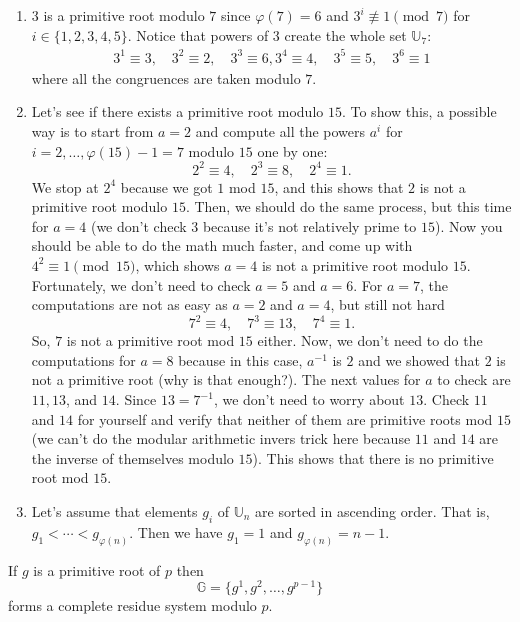 \documentclass{subfile}
\begin{document}
		\begin{example}
		$ $
		\begin{enumerate}
			\item $3$ is a primitive root modulo $7$ since $\varphi(7)=6$ and $3^i\not\equiv1\pmod 7$ for $i\in\{1,2,3,4,5\}$. Notice that powers of $3$ create the whole set $\mathbb U_7$:
			\begin{align*}
				3^1 \equiv 3, \quad 3^2 \equiv 2, \quad 3^3 \equiv 6, 3^4 \equiv 4, \quad 3^5 \equiv 5, \quad 3^6 \equiv 1
			\end{align*}
			where all the congruences are taken modulo $7$.
			\item Let's see if there exists a primitive root modulo $15$. To show this, a possible way is to start from $a=2$ and compute all the powers $a^i$ for $i=2,\ldots,\varphi(15)-1=7$ modulo $15$ one by one:
			$$ 2^2 \equiv 4, \quad 2^3 \equiv 8, \quad 2^4 \equiv 1.$$
			We stop at $2^4$ because we got $1$ mod $15$, and this shows that $2$ is not a primitive root modulo $15$. Then, we should do the same process, but this time for $a=4$ (we don't check $3$ because it's not relatively prime to $15$). Now you should be able to do the math much faster, and come up with $4^2 \equiv 1 \pmod{15}$, which shows $a=4$ is not a primitive root modulo $15$. Fortunately, we don't need to check $a=5$ and $a=6$. For $a=7$, the computations are not as easy as $a=2$ and $a=4$, but still not hard
			$$7^2 \equiv 4, \quad 7^3 \equiv 13, \quad 7^4 \equiv 1.$$
			So, $7$ is not a primitive root mod $15$ either. Now, we don't need to do the computations for $a=8$ because in this case, $a^{-1}$ is $2$ and we showed that $2$ is not a primitive root (why is that enough?). The next values for $a$ to check are $11, 13$, and $14$. Since $13=7^{-1}$, we don't need to worry about $13$. Check $11$ and $14$ for yourself and verify that neither of them are primitive roots mod $15$ (we can't do the modular arithmetic invers trick here because $11$ and $14$ are the inverse of themselves modulo $15$). This shows that there is no primitive root mod $15$.

			\item Let's assume that elements $g_i$ of $\mathbb U_n$ are sorted in ascending order. That is, $g_1<\cdots<g_{\varphi(n)}$. Then we  have $g_1=1$ and $g_{\varphi(n)}=n-1$.
		\end{enumerate}
	\end{example}


	\begin{corollary}\label{cor:prres}
		If $g$ is a primitive root of $p$ then
		\[\mathbb G=\{g^1,g^2,\ldots,g^{p-1}\}\]
		forms a complete residue system modulo $p$.
	\end{corollary}
\end{document}

